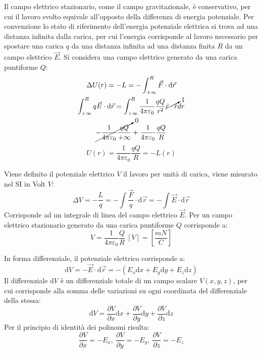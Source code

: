 \documentclass{article}
\newcommand{\df}{\mathrm{d}}
\numberwithin{equation}{subsection}
\begin{document}
Il campo elettrico stazionario, come il campo gravitazionale, è conservativo, per cui il lavoro svolto equivale all'opposto della differenza di energia potenziale. Per 
convenzione lo stato di riferimento dell'energia potenziale elettrica si trova ad una distanza infinita dalla carica, per cui l'energia corrisponde al lavoro necessario per 
spostare una carica $q$ da una distanza infinita ad una distanza finita $R$ da un campo elettrico $\vec{E}$. Si considera una campo elettrico generato da una carica puntiforme 
$Q$:
\begin{gather*}
    \Delta U(r)=-L=-\displaystyle\int_{+\infty}^R\vec{F}\cdot \df\vec{r}\\
    \displaystyle\int_{+\infty}^Rq\vec{E}\cdot \df\vec{r}=\int_{+\infty}^R\frac{1}{4\pi\varepsilon_0}\frac{qQ}{r^2}\cancelto{1}{\hat{r}\cdot \hat{r}}dr\\
    \cancelto{0}{-\displaystyle\frac{1}{4\pi\varepsilon_0}\frac{qQ}{+\infty}}+\frac{1}{4\pi\varepsilon_0}\frac{qQ}{R}
\end{gather*}
\begin{equation}
    U(r)=\frac{1}{4\pi\varepsilon_0}\frac{qQ}{R}=-L(r)
\end{equation}


Viene definito il potenziale elettrico $V$ il lavoro per unità di carica, viene misurato nel SI in Volt $V$:
\begin{equation}
    \Delta V=\displaystyle-\frac{L}{q}=-\int\frac{\vec{F}}{q}\cdot \df\vec{r}=-\int\vec{E}\cdot \df\vec{r}
\end{equation}
Corrisponde ad un integrale di linea del campo elettrico $\vec{E}$. 
Per un campo elettrico stazionario generato da una carica puntiforme $Q$ corrisponde a:
\begin{equation}
    V=\displaystyle\frac{1}{4\pi\varepsilon_0}\frac{Q}{R}\:\left[V\right]=\left[\frac{mN}{C}\right]
\end{equation}

In forma differenziale, il potenziale elettrico corrisponde a:
\begin{equation*}
    \df V=-\vec{E}\cdot \df\vec{r}=-(E_x\df x+E_y\df y+E_z\df z)
\end{equation*}
Il differenziale $\df V$ è un differenziale totale di un campo scalare $V(x,y,z)$, per cui corrisponde alla somma delle variazioni su ogni coordinata del differenziale della stessa: 
\begin{equation*}
    \df V=\displaystyle\frac{\partial V}{\partial x}\df  x+\frac{\partial V}{\partial y}\df  y+\frac{\partial V}{\partial z}\df  z
\end{equation*}
Per il principio di identità dei polinomi risulta:
\begin{equation*}
    \displaystyle\frac{\partial V}{\partial x}=-E_x,\:\frac{\partial V}{\partial y}=-E_y,\:\frac{\partial V}{\partial z}=-E_z
\end{equation*}
\end{document}

